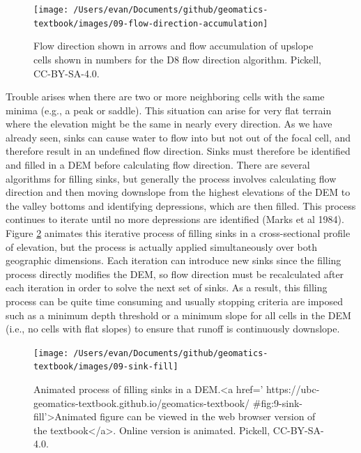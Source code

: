 \documentclass[
]{book}
\begin{document}
\begin{figure}
\texttt{[image: /Users/evan/Documents/github/geomatics-textbook/images/09-flow-direction-accumulation]} \caption{Flow direction shown in arrows and flow accumulation of upslope cells shown in numbers for the D8 flow direction algorithm. Pickell, CC-BY-SA-4.0.}\label{fig:9-flow-direction-accumulation}
\end{figure}

Trouble arises when there are two or more neighboring cells with the same minima (e.g., a peak or saddle). This situation can arise for very flat terrain where the elevation might be the same in nearly every direction. As we have already seen, sinks can cause water to flow into but not out of the focal cell, and therefore result in an undefined flow direction. Sinks must therefore be identified and filled in a DEM before calculating flow direction. There are several algorithms for filling sinks, but generally the process involves calculating flow direction and then moving downslope from the highest elevations of the DEM to the valley bottoms and identifying depressions, which are then filled. This process continues to iterate until no more depressions are identified (Marks et al 1984). Figure \ref{fig:9-sink-fill} animates this iterative process of filling sinks in a cross-sectional profile of elevation, but the process is actually applied simultaneously over both geographic dimensions. Each iteration can introduce new sinks since the filling process directly modifies the DEM, so flow direction must be recalculated after each iteration in order to solve the next set of sinks. As a result, this filling process can be quite time consuming and usually stopping criteria are imposed such as a minimum depth threshold or a minimum slope for all cells in the DEM (i.e., no cells with flat slopes) to ensure that runoff is continuously downslope.

\begin{figure}
\texttt{[image: /Users/evan/Documents/github/geomatics-textbook/images/09-sink-fill]} \caption{Animated process of filling sinks in a DEM.<a href=' https://ubc-geomatics-textbook.github.io/geomatics-textbook/ #fig:9-sink-fill'>Animated figure can be viewed in the web browser version of the textbook</a>. Online version is animated. Pickell, CC-BY-SA-4.0.}\label{fig:9-sink-fill}
\end{figure}
\end{document}
